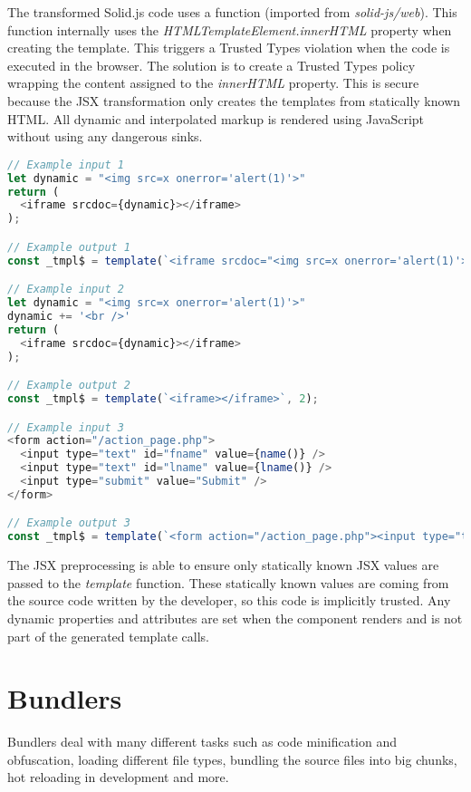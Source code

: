 The transformed Solid.js code uses a  function (imported from \emph{solid-js/web}).
This function internally uses the \emph{HTMLTemplateElement.innerHTML} property when creating the
template. This triggers a Trusted Types violation when the code is executed in the browser. The
solution is to create a Trusted Types policy wrapping the content assigned to the \emph{innerHTML}
property. This is secure because the JSX transformation only creates the templates from statically
known HTML. All dynamic and interpolated markup is rendered using JavaScript without using any
dangerous sinks.

\bigskip
\begin{lstlisting}[language=JavaScript, caption=Examples of JSX transformations]
// Example input 1
let dynamic = "<img src=x onerror='alert(1)'>"
return (
  <iframe srcdoc={dynamic}></iframe>
);

// Example output 1
const _tmpl$ = template(`<iframe srcdoc="<img src=x onerror='alert(1)'>"></iframe>`, 3);

// Example input 2
let dynamic = "<img src=x onerror='alert(1)'>"
dynamic += '<br />'
return (
  <iframe srcdoc={dynamic}></iframe>
);

// Example output 2
const _tmpl$ = template(`<iframe></iframe>`, 2);

// Example input 3
<form action="/action_page.php">
  <input type="text" id="fname" value={name()} />
  <input type="text" id="lname" value={lname()} />
  <input type="submit" value="Submit" />
</form>

// Example output 3
const _tmpl$ = template(`<form action="/action_page.php"><input type="text" id="fname"><input type="text" id="lname"><input type="submit" value="Submit"></form>`, 5);
\end{lstlisting}

The JSX preprocessing is able to ensure only statically known JSX values are passed to the
\emph{template} function. These statically known values are coming from the source code written by
the developer, so this code is implicitly trusted. Any dynamic properties and attributes are set
when the component renders and is not part of the generated template calls.

\section{Bundlers}

Bundlers deal with many different tasks such as code minification and obfuscation, loading different
file types, bundling the source files into big chunks, hot reloading in development and more.


